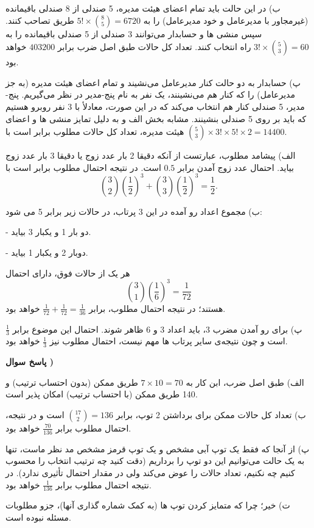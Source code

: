 \documentclass[10pt,letterpaper]{report}
\newcounter{questionanswernumber}
\newcommand{\QA}{
\textbf{پاسخ سوال \thequestionanswernumber)}
\stepcounter{questionanswernumber}
}
\begin{document}
ب) در این حالت باید تمام اعضای هیئت مدیره، 5 صندلی از 8 صندلی باقیمانده (غیرمجاور با مدیرعامل و خود مدیرعامل) را به 
$
5!\times \binom{8}{5}=6720
$
طریق تصاحب کنند. سپس منشی ها و حسابدار می‌توانند 3 صندلی از 5 صندلی باقیمانده را به 
$
3!\times\binom{5}{3}=60
$
راه انتخاب کنند. تعداد کل حالات طبق اصل ضرب برابر 
$
403200
$
خواهد بود.

پ) حسابدار به دو حالت کنار مدیرعامل می‌نشیند و تمام اعضای هیئت مدیره (به جز مدیرعامل) را که کنار هم می‌نشینند، یک نفر به نام پنج-مدیر در نظر می‌گیریم. پنج-مدیر، 5 صندلی کنار هم انتخاب می‌کند که در این صورت، معادلأ با 3 نفر روبرو هستیم که باید بر روی 5 صندلی بنشینند. مشابه بخش الف و به دلیل تمایز منشی ها و اعضای هیئت مدیره، تعداد کل حالات مطلوب برابر است با
$
\binom{5}{3}\times 3!\times 5!\times 2=14400
$.

الف) پیشامد مطلوب، عبارتست از آنکه دقیقا 2 بار عدد زوج یا دقیقا 3 بار عدد زوج بیاید. احتمال عدد زوج آمدن برابر $0.5$ است. در نتیجه احتمال مطلوب برابر است با
$$
\binom{3}{2}(\frac{1}{2})^3+\binom{3}{3}(\frac{1}{2})^3=\frac{1}{2}.
$$

ب) مجموع اعداد رو آمده در این 3 پرتاب، در حالات زیر برابر 5 می شود:

- دو بار 1 و یکبار 3 بیاید.

- دوبار 2 و یکبار 1 بیاید.

هر یک از حالات فوق، دارای احتمال
$$
\binom{3}{1}(\frac{1}{6})^3=\frac{1}{72}
$$
هستند؛ در نتیجه احتمال مطلوب، برابر 
$
\frac{1}{72}+\frac{1}{72}=\frac{1}{36}
$
خواهد بود.

پ) برای رو آمدن مضرب 3، باید اعداد 3 و 6 ظاهر شوند. احتمال این موضوع برابر 
$
\frac{1}{3}
$
است و چون نتیجه‌ی سایر پرتاب ها مهم نیست، احتمال مطلوب نیز 
$
\frac{1}{3}
$
خواهد بود.

\QA

الف) طبق اصل ضرب، ابن کار به 
$
7\times 10=70
$
طریق ممکن (بدون احتساب ترتیب) و 140 طریق ممکن (با احتساب ترتیب) امکان پذیر است.

ب) تعداد کل حالات ممکن برای برداشتن 2 توپ، برابر 
$
\binom{17}{2}=136
$
است و در نتیجه، احتمال مطلوب برابر 
$
\frac{70}{136}
$
خواهد بود.

پ) از آنجا که فقط یک توپ آبی مشخص و یک توپ قرمز مشخص مد نظر ماست، تنها به یک حالت می‌توانیم این دو توپ را برداریم (دقت کنید چه ترتیب انتخاب را محسوب کنیم چه نکنیم، تعداد حالات را عوض می‌کند ولی در مقدار احتمال تأثیری ندارد). در نتیجه احتمال مطلوب برابر 
$
\frac{1}{136}
$
خواهد بود.

ت) خیر؛ چرا که متمایز کردن توپ ها (به کمک شماره گذاری آنها)، جزو مطلوبات مسئله نبوده است.
\end{document}
